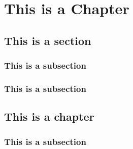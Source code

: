 \chapter{This is a Chapter}

\section{This is a section}

\subsection{This is a subsection}
\lipsum[10]

\begin{theorem}
    \lipsum[4]
\end{theorem}

\begin{definition}
    \lipsum[2]
\end{definition}

\begin{exercise}
    \lipsum[1]
\end{exercise}

\begin{method}
    \lipsum[1-2]
\end{method}


\begin{definition}
    \lipsum[6]
\end{definition}



\subsection{This is a subsection}
\lipsum[10]

\begin{theorem}
    \lipsum[4]
\end{theorem}

\begin{definition}
    \lipsum[2]\lipsum[2]
\end{definition}

\begin{definition}
    \lipsum[6]
\end{definition}

\begin{method}
    \lipsum[1]
\end{method}


\section{This is a chapter}

\subsection{This is a subsection}
\lipsum[10]

\begin{theorem}
    \lipsum[4]
\end{theorem}

\begin{definition}
    \lipsum[2]\lipsum[2]
\end{definition}

\begin{definition}
    \lipsum[6]
\end{definition}

\begin{method}
    \lipsum[1]
\end{method}

